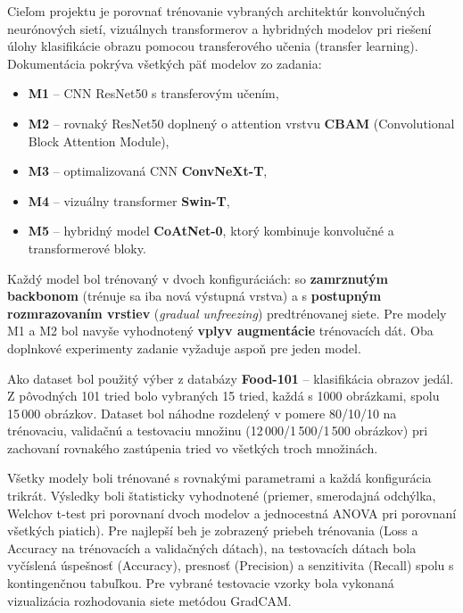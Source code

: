 Cieľom projektu je porovnať trénovanie vybraných architektúr konvolučných
neurónových sietí, vizuálnych transformerov a hybridných modelov pri riešení
úlohy klasifikácie obrazu pomocou transferového učenia (transfer learning).
Dokumentácia pokrýva všetkých päť modelov zo zadania:

\begin{itemize}
    \item \textbf{M1} -- CNN ResNet50 s transferovým učením,
    \item \textbf{M2} -- rovnaký ResNet50 doplnený o attention vrstvu
          \textbf{CBAM} (Convolutional Block Attention Module),
    \item \textbf{M3} -- optimalizovaná CNN \textbf{ConvNeXt-T},
    \item \textbf{M4} -- vizuálny transformer \textbf{Swin-T},
    \item \textbf{M5} -- hybridný model \textbf{CoAtNet-0}, ktorý kombinuje
          konvolučné a transformerové bloky.
\end{itemize}

\noindent Každý model bol trénovaný v dvoch konfiguráciách: so
\textbf{zamrznutým backbonom} (trénuje sa iba nová výstupná vrstva) a
s \textbf{postupným rozmrazovaním vrstiev} (\emph{gradual unfreezing})
predtrénovanej siete. Pre modely M1 a M2 bol navyše vyhodnotený
\textbf{vplyv augmentácie} trénovacích dát. Oba doplnkové experimenty
zadanie vyžaduje aspoň pre jeden model.

Ako dataset bol použitý výber z databázy \textbf{Food-101} -- klasifikácia
obrazov jedál. Z pôvodných 101 tried bolo vybraných 15 tried, každá s 1000
obrázkami, spolu 15\,000 obrázkov. Dataset bol náhodne rozdelený v pomere
80/10/10 na trénovaciu, validačnú a testovaciu množinu (12\,000/1\,500/1\,500
obrázkov) pri zachovaní rovnakého zastúpenia tried vo všetkých troch
množinách.

Všetky modely boli trénované s rovnakými parametrami a každá konfigurácia
trikrát. Výsledky boli štatisticky vyhodnotené (priemer, smerodajná
odchýlka, Welchov t-test pri porovnaní dvoch modelov a jednocestná ANOVA
pri porovnaní všetkých piatich). Pre najlepší beh je zobrazený priebeh
trénovania (Loss a Accuracy na trénovacích a validačných dátach), na
testovacích dátach bola vyčíslená úspešnosť (Accuracy), presnosť (Precision)
a senzitivita (Recall) spolu s kontingenčnou tabuľkou. Pre vybrané
testovacie vzorky bola vykonaná vizualizácia rozhodovania siete metódou
GradCAM.
